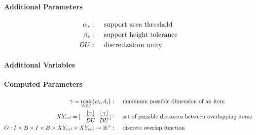\paragraph*{Additional Parameters}
\begin{align*}
    \alpha_s  :\hspace{.5cm}& \text{support area threshold} \\
    \beta_s  :\hspace{.5cm}& \text{support height tolerance} \\
    DU      :\hspace{.5cm}& \text{discretization unity} \\
\end{align*}

\paragraph*{Additional Variables}


\paragraph*{Computed Parameters}
\begin{align}
    \gamma = \max_{\forall i \in I}\{ w_i, d_i \}  :\hspace{.5cm}& \text{maximum possible dimension of an item} \notag \\
    XY_{rel} =  [ - \frac{\lfloor \gamma \rfloor}{DU}, \frac{\lfloor \gamma \rfloor}{DU}]  :\hspace{.5cm}& \text{set of possible distances between overlapping items} \notag \\
    O : I \times B \times I \times B \times XY_{rel} \times XY_{rel} \rightarrow \mathbb{R}^+ :\hspace{.5cm}& \text{discrete overlap function} \label{eq:overlap_function}
\end{align}